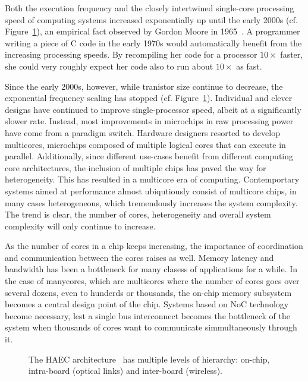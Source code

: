 Both the execution frequency and the closely intertwined single-core processing speed of computing systems increased exponentially up until the early 2000s (cf. Figure~\ref{fig:multicore_era}), an empirical fact observed by Gordon Moore in 1965~\cite{moore}.
A programmer writing a piece of C code in the early 1970s would automatically benefit from the increasing processing speeds.
By recompiling her code for a processor $10 \times$ faster, she could very roughly expect her code also to run about $10 \times$ as fast.%

Since the early 2000s, however, while tranistor size continue to decrease, the exponential frequency scaling has stopped (cf. Figure~\ref{fig:multicore_era}).
Individual and clever designs have continued to improve single-processor speed, albeit at a significantly slower rate.
Instead, most improvements in microchips in raw processing power have come from a paradigm switch.
Hardware designers resorted to develop multicores, microchips composed of multiple logical cores that can execute in parallel.
Additionally, since different use-cases benefit from different computing core architectures, the inclusion of multiple chips has paved the way for heterogeneity.
This has resulted in a multicore era of computing.
Contemportary systems aimed at performance almost ubiqutiously consist of multicore chips, in many cases heterogeneous, which tremendously increases the system complexity.
The trend is clear, the number of cores, heterogeneity and overall system complexity will only continue to increase.

As the number of cores in a chip keeps increasing, the importance of coordination and communication between the cores raises as well.
Memory latency and bandwidth has been a bottleneck for many clasess of applications for a while.
In the case of manycores, which are multicores where the number of cores goes over several dozens, even to hunderds or thousands, the on-chip memory subsystem becomes a central design point of the chip.
Systems based on \ac{NoC} technology become necessary, lest a single bus interconnect becomes the bottleneck of the system when thousands of cores want to communicate simmultaneously through it.

\begin{figure}[h]
	\centering
   \resizebox{0.75\textwidth}{!}{}
   \caption{The HAEC architecture~\cite{HAEC} has multiple levels of hierarchy: on-chip, intra-board (optical links) and inter-board (wireless).} 
	\label{fig:multicore_era}
\end{figure}

